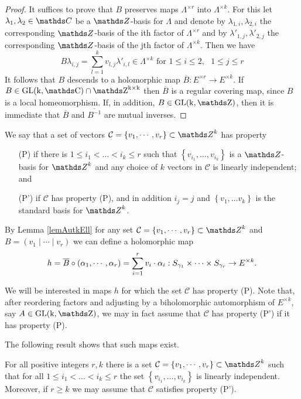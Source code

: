 \begin{proof}
 It suffices to prove that $B$ preserves maps $\Lambda^{\times r}$ into $\Lambda^{\times k}$. For this let $\lambda_1,\lambda_2\in \CC$ be a $\ZZ$-basis for $\Lambda$ and denote by $\lambda_{1,i},\lambda_{2,i}$ the corresponding $\ZZ$-basis of the ith factor of $\Lambda ^ {\times r}$ and by $\lambda'_{1,j},\lambda'_{2,j}$ the corresponding $\ZZ$-basis of the jth factor of $\Lambda^{\times k}$. Then we have
 \[
  B \lambda_{i,j} = \sum _{l=1}^k v_{l,j} \lambda'_{i,l} \in \Lambda^{\times k} \mbox{    for   } 1\leq i \leq 2,\mbox{  }1\leq j \leq r
 \]
It follows that $B$ descends to a holomorphic map $\overline{B}:E^{\times r}\rightarrow E^{\times k}$. If $B\in \rm{GL}(k,\CC)\cap \ZZ^{k\times k}$ then $\overline{B}$ is a regular covering map, since $B$ is a local homeomorphism. If, in addition, $B\in \rm{GL}(k,\ZZ)$, then it is immediate that $\overline{B}$ and $\overline{B^{-1}}$ are mutual inverses.
\end{proof}



We say that a set of vectors $\mathcal{C}=\left\{v_1,\cdots, v_r\right\}\subset\ZZ^k$ has property 
\begin{enumerate}
\item[(P)] if there is $1\leq i_1 < \dots <i_k \leq r$ such that $\left\{v_{i_1},\dots,v_{i_k}\right\}$ is a $\ZZ$-basis for $\ZZ^k$ and any choice of $k$ vectors in $\mathcal{C}$ is linearly independent; and
\item[(P')] if $\mathcal{C}$ has property (P), and in addition $i_j=j$ and $\left\{v_1,\dots v_k\right\}$ is the standard basis for $\ZZ^k$.
\end{enumerate}

By Lemma \ref{lemAutkEll} for any set $\mathcal{C}=\left\{v_1,\cdots,v_r\right\}\subset \ZZ^k$ and $B=\left(v_1\mid \cdots \mid v_r\right)$ we can define a holomorphic map 
\[
h=\overline{B}\circ \left(\alpha_1,\cdots,\alpha_r\right)=\sum \limits_{i=1}^r v_i \cdot \alpha_i :S_{\gamma_1}\times \cdots \times S_{\gamma_r}\rightarrow E^{\times k}.
\]

We will be interested in maps $h$ for which the set $\mathcal{C}$ has property (P). Note that, after reordering factors and adjusting by a biholomorphic automorphism of $E^{\times k}$, say $A\in \rm{GL}(k,\ZZ)$, we may in fact assume that $\mathcal{C}$ has property (P') if it has property (P). 

The following result shows that such maps exist.

\begin{lemma}
 For all positive integers $r,k$ there is a set $\mathcal{C}=\left\{v_1,\cdots,v_r\right\}\subset \ZZ^k$ such that for all $1\leq i_1 <\dots <i_k\leq r$ the set $\left\{v_{i_1},\dots, v_{i_k}\right\}$ is linearly independent. Moreover, if $r\geq k$ we may assume that $\mathcal{C}$ satisfies property (P').
\label{lemLinIndep}
\end{lemma}

